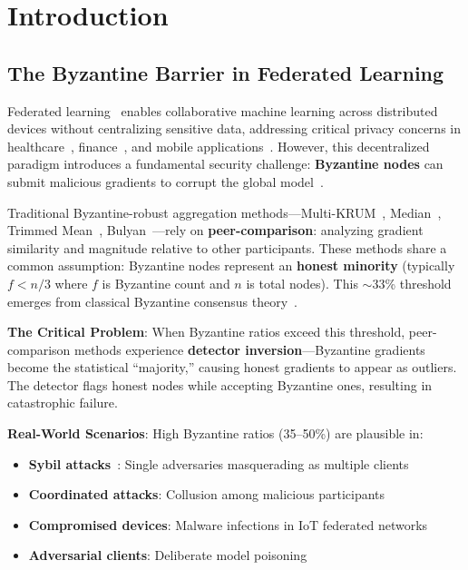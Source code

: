 \section{Introduction}

\subsection{The Byzantine Barrier in Federated Learning}

Federated learning~\cite{mcmahan2017communication} enables collaborative machine learning across distributed devices without centralizing sensitive data, addressing critical privacy concerns in healthcare~\cite{rieke2020future}, finance~\cite{long2020federated}, and mobile applications~\cite{hard2018federated}. However, this decentralized paradigm introduces a fundamental security challenge: \textbf{Byzantine nodes} can submit malicious gradients to corrupt the global model~\cite{lamport1982byzantine}.

Traditional Byzantine-robust aggregation methods---Multi-KRUM~\cite{blanchard2017machine}, Median~\cite{yin2018byzantine}, Trimmed Mean~\cite{yin2018byzantine}, Bulyan~\cite{mhamdi2018machine}---rely on \textbf{peer-comparison}: analyzing gradient similarity and magnitude relative to other participants. These methods share a common assumption: Byzantine nodes represent an \textbf{honest minority} (typically $f < n/3$ where $f$ is Byzantine count and $n$ is total nodes). This $\sim$33\% threshold emerges from classical Byzantine consensus theory~\cite{castro1999practical, lamport1982byzantine}.

\textbf{The Critical Problem}: When Byzantine ratios exceed this threshold, peer-comparison methods experience \textbf{detector inversion}---Byzantine gradients become the statistical ``majority,'' causing honest gradients to appear as outliers. The detector flags honest nodes while accepting Byzantine ones, resulting in catastrophic failure.

\textbf{Real-World Scenarios}: High Byzantine ratios (35--50\%) are plausible in:
\begin{itemize}
    \item \textbf{Sybil attacks}~\cite{fung2018mitigating}: Single adversaries masquerading as multiple clients
    \item \textbf{Coordinated attacks}: Collusion among malicious participants
    \item \textbf{Compromised devices}: Malware infections in IoT federated networks
    \item \textbf{Adversarial clients}: Deliberate model poisoning~\cite{bagdasaryan2020backdoor}
\end{itemize}

